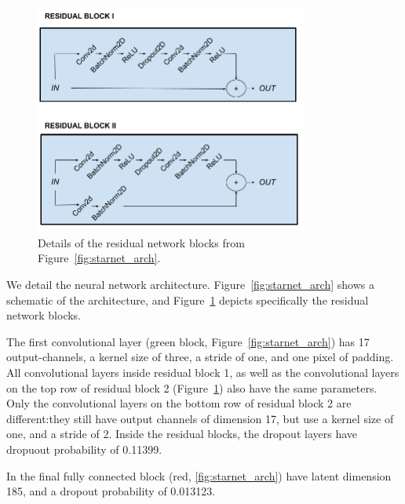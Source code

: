 \begin{figure}[!tb]
    \centering
    \includegraphics[width=0.8\textwidth]{figures/vi_figures/conv_block.png}
    \caption{Details of the residual network blocks from Figure~\ref{fig:starnet_arch}.
    }
    \label{fig:conv_blocks}
\end{figure}


We detail the neural network architecture. 
Figure~\ref{fig:starnet_arch} shows a schematic of the architecture, and 
Figure~\ref{fig:conv_blocks} depicts specifically 
the residual network blocks. 

The first convolutional layer (green block, Figure~\ref{fig:starnet_arch}) has 17 output-channels, a kernel size of three, a stride of one, and one pixel of padding.
All convolutional layers inside residual block 1, as well as the convolutional layers on the top row of residual block 2 (Figure~\ref{fig:conv_blocks}) also have the same parameters. 
Only the convolutional layers on the bottom row of residual block 2 are different:they still have output channels of dimension 17, 
but use a kernel size of one, and a stride of 2. 
Inside the residual blocks, the dropout layers have dropuout probability of 0.11399. 

In the final fully connected block (red, \ref{fig:starnet_arch}) have latent dimension 185, and a dropout probability of 0.013123. 

